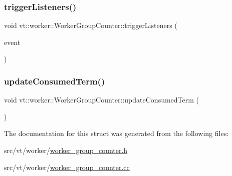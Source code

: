 \mbox{\label{structvt_1_1worker_1_1_worker_group_counter_a39e2bdc226316ec5d4cddc3a6d10fb52}} 
\subsubsection{\texorpdfstring{trigger\+Listeners()}{triggerListeners()}}
{\footnotesize\ttfamily void vt\+::worker\+::\+Worker\+Group\+Counter\+::trigger\+Listeners (\begin{DoxyParamCaption}\item[{\hyperlink{namespacevt_1_1worker_abcb798436f1cdc4fab035def5b912d1f}{e\+Worker\+Group\+Event}}]{event }\end{DoxyParamCaption})\hspace{0.3cm}{\ttfamily [protected]}}

\mbox{\label{structvt_1_1worker_1_1_worker_group_counter_a8aa7187f5ced78fc69e7f323817ea752}} 
\subsubsection{\texorpdfstring{update\+Consumed\+Term()}{updateConsumedTerm()}}
{\footnotesize\ttfamily void vt\+::worker\+::\+Worker\+Group\+Counter\+::update\+Consumed\+Term (\begin{DoxyParamCaption}{ }\end{DoxyParamCaption})\hspace{0.3cm}{\ttfamily [protected]}}



The documentation for this struct was generated from the following files\+:\begin{DoxyCompactItemize}
\item 
src/vt/worker/\hyperlink{worker__group__counter_8h}{worker\+\_\+group\+\_\+counter.\+h}\item 
src/vt/worker/\hyperlink{worker__group__counter_8cc}{worker\+\_\+group\+\_\+counter.\+cc}\end{DoxyCompactItemize}
